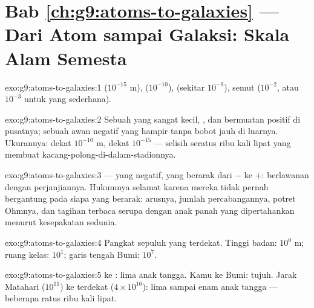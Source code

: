 \section*{Bab \ref{ch:g9:atoms-to-galaxies} --- Dari Atom sampai Galaksi: Skala Alam Semesta}

\begin{solution}{exo:g9:atoms-to-galaxies:1}
 ($10^{-15}$ \unit{m}),  ($10^{-10}$),  (sekitar
$10^{-9}$), semut ($10^{-2}$, atau $10^{-3}$ untuk yang sederhana).
\end{solution}

\begin{solution}{exo:g9:atoms-to-galaxies:2}
Sebuah  yang sangat kecil, , dan bermuatan positif di
pusatnya; sebuah awan  negatif yang hampir tanpa bobot jauh di
luarnya. Ukurannya:  dekat $10^{-10}$ \unit{m},  dekat
$10^{-15}$ --- selisih seratus ribu kali lipat yang membuat
kacang-polong-di-dalam-stadionnya.
\end{solution}

\begin{solution}{exo:g9:atoms-to-galaxies:3}
 --- yang negatif, yang berarak dari $-$ ke $+$: berlawanan
dengan perjanjiannya. Hukumnya selamat karena mereka tidak pernah
bergantung pada siapa yang berarak: arusnya, jumlah percabangannya,
potret Ohmnya, dan tagihan  terbaca serupa dengan anak panah
yang dipertahankan menurut kesepakatan sedunia.
\end{solution}

\begin{solution}{exo:g9:atoms-to-galaxies:4}
Pangkat sepuluh yang terdekat. Tinggi badan: $10^{0}$ \unit{m};
ruang kelas: $10^{1}$; garis tengah Bumi: $10^{7}$.
\end{solution}

\begin{solution}{exo:g9:atoms-to-galaxies:5}
 ke : lima anak tangga. Kamu ke Bumi: tujuh. Jarak Matahari
($10^{11}$) ke  terdekat ($4 \times 10^{16}$): lima sampai enam
anak tangga --- beberapa ratus ribu kali lipat.
\end{solution}

